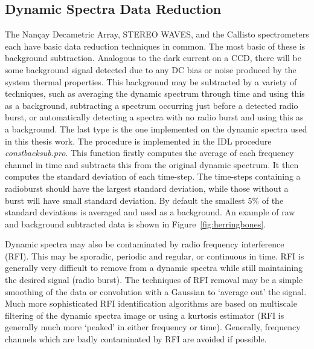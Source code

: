 \subsection{Dynamic Spectra Data Reduction}

The Nan\c{c}ay Decametric Array, STEREO WAVES, and the Callisto spectrometers each have basic data reduction techniques in common. The most basic of these is background subtraction. Analogous to the dark current on a CCD, there will be some background signal detected due to any DC bias or noise produced by the system thermal properties. This background may be subtracted by a variety of techniques, such as averaging the dynamic spectrum through time and using this as a background, subtracting a spectrum occurring just before a detected radio burst, or automatically detecting a spectra with no radio burst and using this as a background. The last type is the one implemented on the dynamic spectra used in this thesis work. The procedure is implemented in the IDL procedure {\it constbacksub.pro}. This function firstly computes the average of each frequency channel in time and subtracts this from the original dynamic spectrum. It then computes the standard deviation of each time-step. The time-steps containing a radioburst should have the largest standard deviation, while those without a burst will have small standard deviation. By default the smallest  5\% of the standard deviations is averaged and used as a background. An example of raw and background subtracted data is shown in Figure~\ref{fig:herringbones}.

Dynamic spectra may also be contaminated by radio frequency interference (RFI). This may be sporadic, periodic and regular, or continuous in time. RFI is generally very difficult to remove from a dynamic spectra while still maintaining the desired signal (radio burst). The techniques of RFI removal may be a simple smoothing of the data or convolution with a Gaussian to `average out' the signal. Much more sophisticated RFI identification algorithms are based on multiscale filtering of the dynamic spectra image or using a kurtosis estimator \citep{nita2007, nita2010}(RFI is generally much more `peaked' in either frequency or time). Generally, frequency channels which are badly contaminated by RFI are avoided if possible.
